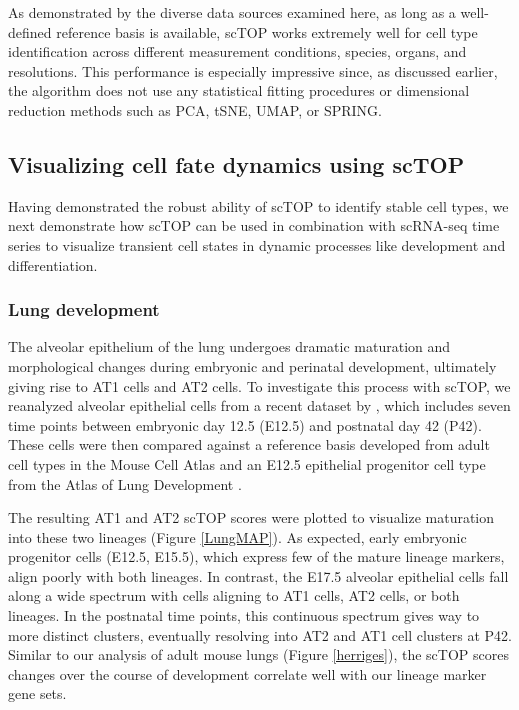 \documentclass[vruler,JEB]{COB}%
\begin{document}
As demonstrated by the diverse data sources examined here, as long as a well-defined reference basis is available, scTOP works extremely well for cell type identification across different measurement conditions, species, organs, and resolutions. This performance is especially impressive since, as discussed earlier, the algorithm does not use any statistical fitting procedures or dimensional reduction methods such as PCA, tSNE, UMAP, or SPRING.

\subsection{Visualizing cell fate dynamics using scTOP }
Having demonstrated the robust ability of scTOP to identify stable cell types, we next demonstrate how scTOP can be used in combination with scRNA-seq time series to visualize transient cell states in dynamic processes like development and differentiation. 

\subsubsection{Lung development}
The alveolar epithelium of the lung undergoes dramatic maturation and morphological changes during embryonic and perinatal development, ultimately giving rise to AT1 cells and AT2 cells. To investigate this process with scTOP, we reanalyzed alveolar epithelial cells from a recent dataset by \cite{zepp2021genomic}, which includes seven time points between embryonic day 12.5 (E12.5) and postnatal day 42 (P42). These cells were then compared against a reference basis developed from adult cell types in the Mouse Cell Atlas and an E12.5 epithelial progenitor cell type from the Atlas of Lung Development  \citep{negretti_single-cell_2021}.

The resulting AT1 and AT2 scTOP scores were plotted to visualize maturation into these two lineages (Figure \ref{LungMAP}). As expected, early embryonic progenitor cells (E12.5, E15.5), which express few of the mature lineage markers, align poorly with both lineages. In contrast, the E17.5 alveolar epithelial cells fall along a wide spectrum with cells aligning to AT1 cells, AT2 cells, or both lineages. In the postnatal time points, this continuous spectrum gives way to more distinct clusters, eventually resolving into AT2 and AT1 cell clusters at P42. Similar to our analysis of adult mouse lungs (Figure \ref{herriges}), the scTOP scores changes over the course of development correlate well with our lineage marker gene sets.
\end{document}
